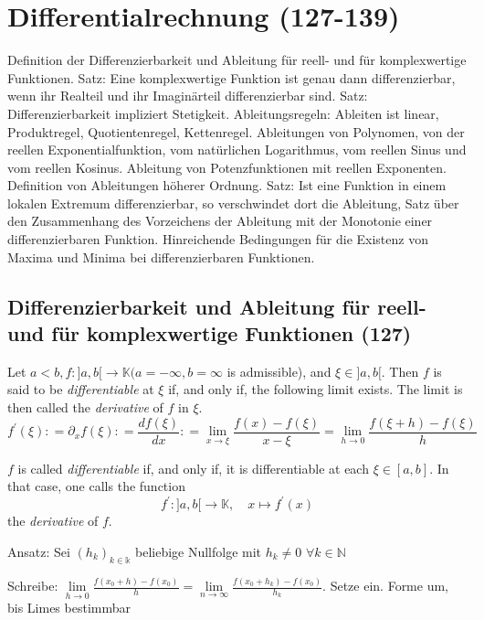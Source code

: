 \section{Differentialrechnung (127-139)}
 
Definition der Differenzierbarkeit und Ableitung für reell- und für komplexwertige Funktionen. Satz: Eine komplexwertige Funktion ist genau dann differenzierbar, wenn ihr Realteil und ihr Imaginärteil differenzierbar sind. Satz: Differenzierbarkeit impliziert Stetigkeit. Ableitungsregeln: Ableiten ist linear, Produktregel, Quotientenregel, Kettenregel. Ableitungen von Polynomen, von der reellen Exponentialfunktion, vom natürlichen Logarithmus, vom reellen Sinus und vom reellen Kosinus. Ableitung von Potenzfunktionen mit reellen Exponenten. Definition von Ableitungen höherer Ordnung. Satz: Ist eine Funktion in einem lokalen Extremum differenzierbar, so verschwindet dort die Ableitung, Satz über den Zusammenhang des Vorzeichens der Ableitung mit der Monotonie einer differenzierbaren Funktion. Hinreichende Bedingungen für die Existenz von Maxima und Minima bei differenzierbaren Funktionen. 


\subsection{Differenzierbarkeit und Ableitung für reell- und für komplexwertige Funktionen (127)}
Let $a < b ,f : ] a ,b [ \rightarrow \mathbb { K } ( a = - \infty ,b = \infty$ is admissible), and $\xi \in ] a ,b [$.
Then $f$ is said to be \textit{differentiable} at $\xi$ if, and only if, the following limit exists.
The limit is then called the \textit{derivative} of $f$ in $\xi$.
\begin{equation}
f ^ { \prime } ( \xi ) : = \partial _ { x } f ( \xi ) : = \frac { d f ( \xi ) } { d x } : = \lim _ { x \rightarrow \xi } \frac { f ( x ) - f ( \xi ) } { x - \xi } = \lim _ { h \rightarrow 0} \frac { f ( \xi + h ) - f ( \xi ) } { h }
\end{equation}

$f$ is called \textit{differentiable} if, and only if, it is differentiable at each $\xi \in [ a ,b ]$. In that case, one calls the function
\begin{equation}
f ^ { \prime } : ] a ,b [ \rightarrow \mathbb { K } ,\quad x \mapsto f ^ { \prime } ( x )
\end{equation}
the \textit{derivative} of $f$.
\newline
\begin{leftbar}
Ansatz: Sei $(h_k)_{k \in \mathbb{k}}$ beliebige Nullfolge mit $h_k \neq 0$ $\forall k \in \mathbb{N}$

Schreibe: $\lim\limits_{h \rightarrow 0} \frac{f(x_0+h)-f(x_0)}{h} = \lim\limits_{n \rightarrow \infty} \frac{f(x_0+h_k)-f(x_0)}{h_k}$. Setze ein. Forme um, bis Limes bestimmbar
\end{leftbar}

